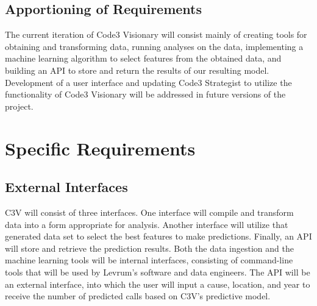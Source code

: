 \documentclass[onecolumn, draftclsnofoot,10pt, compsoc]{IEEEtran}
\begin{document}
    \subsection{Apportioning of Requirements}
    The current iteration of Code3 Visionary will consist mainly of creating tools for obtaining and transforming data, running analyses on the data, implementing a machine learning algorithm to select features from the obtained data, and building an API to store and return the results of our resulting model.
    Development of a user interface and updating Code3 Strategist to utilize the functionality of Code3 Visionary will be addressed in future versions of the project.
    
\section{Specific Requirements}
    \subsection {External Interfaces}
    C3V will consist of three interfaces. One interface will compile and transform data into a form appropriate for analysis. Another interface will utilize that generated data set to select the best features to make predictions. Finally, an API will store and retrieve the prediction results.
    Both the data ingestion and the machine learning tools will be internal interfaces, consisting of command-line tools that will be used by Levrum's software and data engineers.
    The API will be an external interface, into which the user will input a cause, location, and year to receive the number of predicted calls based on C3V's predictive model.
    
\end{document}
